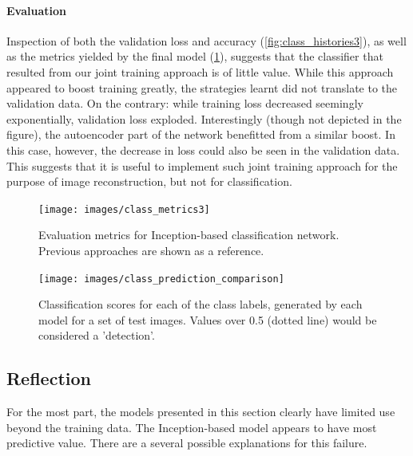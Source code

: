 \paragraph{Evaluation}
Inspection of both the validation loss and accuracy (\ref{fig:class_histories3}), as well as the metrics yielded by the final model (\ref{fig:class_metrics3}), suggests that the classifier that resulted from our joint training approach is of little value. While this approach appeared to boost training greatly, the strategies learnt did not translate to the validation data.  On the contrary: while training loss decreased seemingly exponentially, validation loss exploded. Interestingly (though not depicted in the figure), the autoencoder part of the network benefitted from a similar boost. In this case, however, the decrease in loss could also be seen in the validation data. This suggests that it is useful to implement such joint training approach for the purpose of image reconstruction, but not for classification. 


\begin{figure}[!htbp]
	\begin{center}
		\texttt{[image: images/class\_metrics3]}
		\caption{Evaluation metrics for Inception-based classification network. Previous approaches are shown as a reference.}
		\label{fig:class_metrics3}
	\end{center}
\end{figure}


\begin{figure}[!htbp]
	\begin{center}
		\texttt{[image: images/class\_prediction\_comparison]}
		\caption{Classification scores for each of the class labels, generated by each model for a set of test images. Values over 0.5 (dotted line) would be considered a 'detection'.}
		\label{fig:class_prediction}
	\end{center}
\end{figure}





\subsection{Reflection}
For the most part, the models presented in this section clearly have limited use beyond the training data. The Inception-based model appears to have most predictive value. There are a several possible explanations for this failure.

